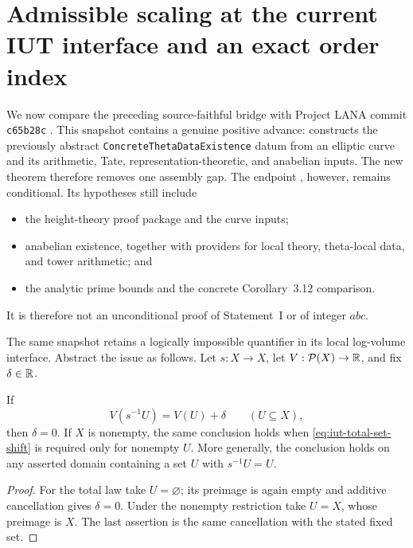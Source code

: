 \section{Admissible scaling at the current IUT interface and an exact order index}
\label{sec:iut-admissible-scaling-order-index}

We now compare the preceding source-faithful bridge with Project LANA commit
\texttt{c65b28c} \cite{LANAleanCurrent}.  This snapshot contains a genuine
positive advance:  constructs the previously
abstract \texttt{ConcreteThetaData\allowbreak Existence} datum from an elliptic
curve and its
arithmetic, Tate, representation-theoretic, and anabelian inputs.  The new
theorem  therefore removes one
assembly gap.  The endpoint
, however, remains conditional.  Its
hypotheses still include
\begin{itemize}
\item the height-theory proof package
   and the curve inputs;
\item anabelian existence, together with providers for local theory,
  theta-local data, and tower arithmetic; and
\item the analytic prime bounds and the concrete Corollary~3.12 comparison.
\end{itemize}
It is therefore not an unconditional proof of Statement~I or of integer
$abc$.

The same snapshot retains a logically impossible quantifier in its local
log-volume interface.  Abstract the issue as follows.  Let $s:X\to X$, let
$V:\mathcal P(X)\to\mathbb R$, and fix $\delta\in\mathbb R$.

\begin{theorem}
\label{thm:iut-total-set-scaling-no-go}
If
\begin{equation}\label{eq:iut-total-set-shift}
             V(s^{-1}U)=V(U)+\delta
             \qquad(U\subseteq X),
\end{equation}
then $\delta=0$.  If $X$ is nonempty, the same conclusion holds when
\eqref{eq:iut-total-set-shift} is required only for nonempty $U$.
More generally, the conclusion holds on any asserted domain containing a set
$U$ with $s^{-1}U=U$.
\end{theorem}

\begin{proof}
For the total law take $U=\varnothing$; its preimage is again empty and
additive cancellation gives $\delta=0$.  Under the nonempty restriction take
$U=X$, whose preimage is $X$.  The last assertion is the same cancellation
with the stated fixed set.
\end{proof}

